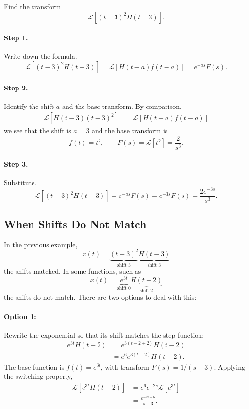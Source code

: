 \documentclass[10pt,letterpaper]{article}
\begin{document}
\begin{example}[4]{
Find the transform
\[
\mathcal L[(t-3)^2H(t-3)].
\]
}
\paragraph{Step 1.} Write down the formula.
\[
\mathcal L[(t-3)^2H(t-3)] =\mathcal{L}\left[H(t-a)f(t-a)\right] =e^{-as}F(s).
\]
\paragraph{Step 2.} Identify the shift $a$ and the base transform. By comparison, 
\begin{align*}    
\mathcal L[H(t-3)(t-3)^2] &=\mathcal{L}\left[H(t-a)f(t-a)\right]
\end{align*}
we see that the shift is $a=3$ and the base transform is
\[
f(t)=t^2,
\qquad
F(s)=\mathcal L[t^2]=\frac{2}{s^3}.
\]
\paragraph{Step 3.} Substitute.
\[
\mathcal L[(t-3)^2H(t-3)] =e^{-as}F(s)
=e^{-3s}F(s)
=\boxed{\frac{2e^{-3s}}{s^3}.}
\]
\end{example}
\subsection{When Shifts Do Not Match}
In the previous example, 
\[
 x(t)=\underbrace{(t-3)^2}_{\text{shift 3}}\underbrace{H(t-3)}_{\text{shift 3}}
\]
the shifts matched. In some functions, such as 
$$
x(t)=\underbrace{e^{3t}}_{\text{shift 0}}\underbrace{H(t-2)}_{\text{shift 2}} 
$$
the shifts do not match. There are two options to deal with this:
\paragraph{Option 1:} Rewrite the exponential so that
its shift matches the step function:
\begin{align*}
e^{3t}H(t-2)
&=e^{3(t-2+2)}H(t-2)\\
&=e^6e^{3(t-2)}H(t-2).
\end{align*}
The base function is $f(t)=e^{3t}$, with transform
$F(s)=1/(s-3)$. Applying the switching property,
\begin{align*}
\mathcal L[e^{3t}H(t-2)]
&=e^6e^{-2s}\mathcal L[e^{3t}]\\
&=\boxed{\frac{e^{-2s+6}}{s-3}.}
\end{align*}
\end{document}

